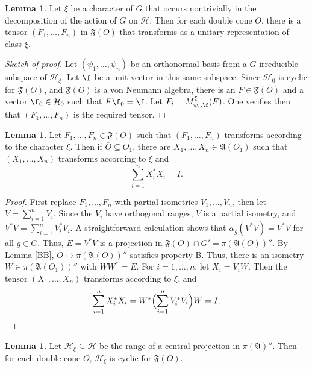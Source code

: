 \documentclass[11pt]{article}
\theoremstyle{definition}
\newtheorem{lemma}[thm]{Lemma}
\theoremstyle{definition}
\theoremstyle{remark}
\def\2#1{{\mathcal #1}}
\def\ol#1{{\overline #1}}
\def\al#1{{\mathfrak #1}}
\def\a{\alpha} \def\b{\beta} \def\g{\gamma} \def\d{\delta}
\begin{document}
\begin{lemma} Let $\xi$ be a character of $G$ that occurs
  nontrivially in the decomposition of the action of $G$ on $\2H$.
  Then for each double cone $O$, there is a tensor $(F_1,\dots ,F_n)$
  in $\al F(O)$ that transforms as a unitary representation of class
  $\xi$.
  \label{fullm}
\end{lemma}

\begin{proof}[Sketch of proof] Let $(\psi _1,\dots ,\psi _n)$ be an
  orthonormal basis from a $G$-irreducible subspace of $\2H _\xi$.
  Let $\f$ be a unit vector in this same subspace.  Since $\2H _0$ is
  cyclic for $\al F(O)$, and $\al F(O)$ is a von Neumann algebra,
  there is an $F\in \al F(O)$ and a vector $\f _0\in \2H _0$ such that
  $F\f _0=\f$.  Let $F_i=M^{\xi}_{\psi _i, \f } (F)$.  One verifies
  then that $(F_1,\dots ,F_n)$ is the required tensor.
\end{proof}


\begin{lemma} Let $F_1,\dots ,F_n\in \al F(O)$ such that $(F_1,\dots
  ,F_n)$ transforms according to the character $\xi$.  Then if $\ol
  O\subseteq O_1$, there are $X_1,\dots ,X_n\in \al A(O_1)$ such that
$(X_1,\dots ,X_n)$ transforms according to $\xi$ and
$$ \sum _{i=1}^{n}X_i^*X_i=I .$$  \label{support}
\end{lemma}

\begin{proof} First replace $F_1,\dots ,F_n$ with partial isometries
  $V_1,\dots ,V_n$, then let $V=\sum _{i=1}^{n}V_i$.  Since the $V_i$
  have orthogonal ranges, $V$ is a partial isometry, and $V^*V=\sum
  _{i=1}^{n}V_i^*V_i$.  A straightforward calculation shows that $\a
  _g(V^*V)=V^*V$ for all $g\in G$.  Thus, $E=V^*V$ is a projection in
  $\al F(O)\cap G'=\pi (\al A(O))''$.  By Lemma \ref{BB}, $O\mapsto
  \pi (\al A(O))''$ satisfies property B.  Thus, there is an isometry
  $W\in \pi (\al A (O_1))''$ with $WW^*=E$.  For $i=1,\dots ,n$, let
  $X_i=V_iW$.  Then the tensor $(X_1,\dots ,X_n)$ transforms according
  to $\xi$, and
$$\sum _{i=1}^{n}X_i^*X_i=W^*\Bigl( \sum _{i=1}^{n}V_i^*V_i \Bigr) W =I .$$
\end{proof}

\begin{lemma} Let $\2H _\xi\subseteq \2H$ be the range of a central
  projection in $\pi (\al A)''$.  Then for each double cone $O$, $\2H
  _\xi$ is cyclic for $\al F(O)$.  \label{sectors} \end{lemma}
\end{document}
